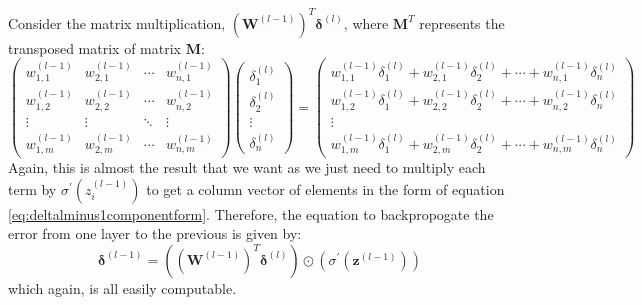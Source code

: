 \documentclass[12pt]{report}
\begin{document}
Consider the matrix multiplication, ${\left(\mathbf{W}^{\left(l-1\right)}\right)}^{T}\bm{\delta}^{\left(l\right)}$, where $\mathbf{M}^T$ represents the transposed matrix of matrix $\mathbf{M}$:
\begin{equation}
    \begin{pmatrix}w^{\left(l-1\right)}_{1,1}&w^{\left(l-1\right)}_{2,1}&\cdots&w^{\left(l-1\right)}_{n,1}\\[0.3em]w^{\left(l-1\right)}_{1,2}&w^{\left(l-1\right)}_{2,2}&\cdots&w^{\left(l-1\right)}_{n,2}\\\vdots&\vdots&\ddots&\vdots\\w^{\left(l-1\right)}_{1,m}&w^{\left(l-1\right)}_{2,m}&\cdots&w^{\left(l-1\right)}_{n,m}\end{pmatrix}\begin{pmatrix}{\delta}^{\left(l\right)}_1\\[0.3em]{\delta}^{\left(l\right)}_2\\\vdots \\{\delta}^{\left(l\right)}_n\end{pmatrix}=\begin{pmatrix}w^{\left(l-1\right)}_{1,1}{\delta}^{\left(l\right)}_1+w^{\left(l-1\right)}_{2,1}{\delta}^{\left(l\right)}_2+\cdots +w^{\left(l-1\right)}_{n,1}{\delta}^{\left(l\right)}_n\\[0.3em]w^{\left(l-1\right)}_{1,2}{\delta}^{\left(l\right)}_1+w^{\left(l-1\right)}_{2,2}{\delta}^{\left(l\right)}_2+\cdots +w^{\left(l-1\right)}_{n,2}{\delta}^{\left(l\right)}_n\\\vdots\\w^{\left(l-1\right)}_{1,m}{\delta}^{\left(l\right)}_1+w^{\left(l-1\right)}_{2,m}{\delta}^{\left(l\right)}_2+\cdots +w^{\left(l-1\right)}_{n,m}{\delta}^{\left(l\right)}_n\end{pmatrix}
\end{equation}
Again, this is almost the result that we want as we just need to multiply each term by ${\sigma}^{\prime} \left(z^{\left(l-1\right)}_i\right)$ to get a column vector of elements in the form of equation \ref{eq:deltalminus1componentform}. Therefore, the equation to backpropogate the error from one layer to the previous is given by:
\begin{equation}
    \bm{\delta}^{\left(l-1\right)}=\left({\left(\mathbf{W}^{\left(l-1\right)}\right)}^{T}\bm{\delta}^{\left(l\right)}\right)\odot\left({\sigma}^{\prime} \left(\mathbf{z}^{\left(l-1\right)}\right)\right)
\end{equation}
which again, is all easily computable.
\end{document}
